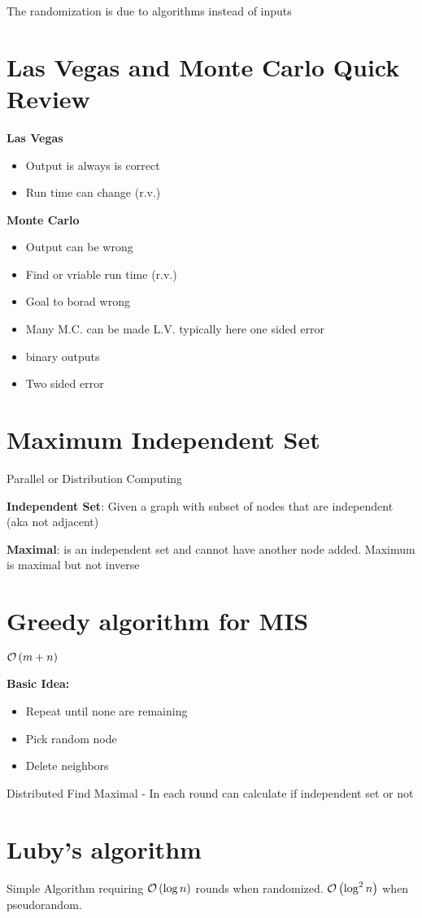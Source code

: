 The randomization is due to algorithms instead of inputs

\section*{Las Vegas and Monte Carlo Quick Review}
\textbf{Las Vegas}
\begin{itemize}
    \item Output is always is correct
    \item Run time can change (r.v.)
\end{itemize}

\textbf{Monte Carlo}
\begin{itemize}
    \item Output can be wrong
    \item Find or vriable run time (r.v.)
    \item Goal to borad wrong
    \item Many M.C. can be made L.V. typically here one sided error
    \item binary outputs
    \item Two sided error
\end{itemize}

\section*{Maximum Independent Set}
Parallel or Distribution Computing

\textbf{Independent Set}: Given a graph with subset of nodes that are independent (aka not adjacent)

\textbf{Maximal}: is an independent set and cannot have another node added. Maximum is maximal but not inverse

\section*{Greedy algorithm for MIS}
$\mathcal{O}\left(m+n\right)$

\textbf{Basic Idea:}
\begin{itemize}
\item Repeat until none are remaining
\item Pick random node
\item Delete neighbors
\end{itemize}

Distributed Find Maximal
- In each round can calculate if independent set or not


\section*{Luby's algorithm}
Simple Algorithm requiring $\mathcal{O}\left(\log n\right)$ rounds when randomized. $\mathcal{O}\left(\log^2 n\right)$ when pseudorandom.

